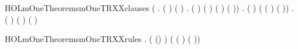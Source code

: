 \newcommand{\HOLmOneTheoremsMOneoutXXind}{\UseVerbatim{HOLmOneTheoremsMOneoutXXind}}
\begin{SaveVerbatim}{HOLmOneTheoremsmOneTRXXclauses}
\HOLTokenTurnstile{} (\HOLSymConst{\HOLTokenForall{}}      .
        (   ) (   ) \HOLSymConst{\HOLTokenEquiv{}}
      \HOLSymConst{\HOLTokenExists{}}  .
        ( \HOLSymConst{=} \HOLSymConst{::}) \HOLSymConst{\HOLTokenConj{}} ( \HOLSymConst{=} ) \HOLSymConst{\HOLTokenConj{}} ( \HOLSymConst{=}   ) \HOLSymConst{\HOLTokenConj{}}
        ( \HOLSymConst{=}   \HOLSymConst{::})) \HOLSymConst{\HOLTokenConj{}}
   \HOLSymConst{\HOLTokenForall{}}     .
       (   )
       (  (  ) (  \HOLSymConst{::})) \HOLSymConst{\HOLTokenEquiv{}}
     \HOLSymConst{\HOLTokenExists{}}. ( \HOLSymConst{=} \HOLSymConst{::}) \HOLSymConst{\HOLTokenConj{}} ( \HOLSymConst{=} ) \HOLSymConst{\HOLTokenConj{}} ( \HOLSymConst{=} )
\end{SaveVerbatim}
\newcommand{\HOLmOneTheoremsmOneTRXXclauses}{\UseVerbatim{HOLmOneTheoremsmOneTRXXclauses}}
\begin{SaveVerbatim}{HOLmOneTheoremsmOneTRXXrules}
\HOLTokenTurnstile{} \HOLSymConst{\HOLTokenForall{}}   .
       ( (\HOLSymConst{::})  )
       (  (  ) (  \HOLSymConst{::}))
\end{SaveVerbatim}
